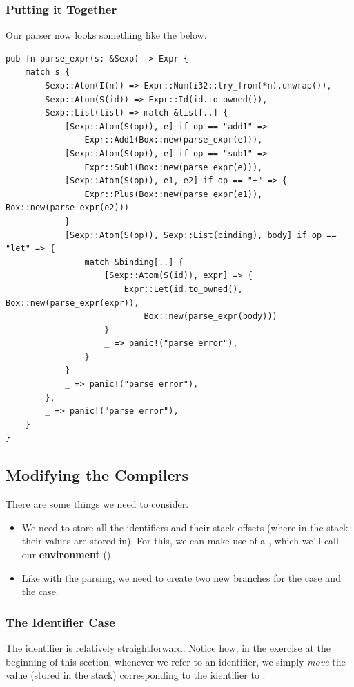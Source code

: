 \documentclass[letterpaper]{article}
\begin{document}
\subsubsection{Putting it Together}
Our parser now looks something like the below.
\begin{verbatim}
pub fn parse_expr(s: &Sexp) -> Expr {
    match s {
        Sexp::Atom(I(n)) => Expr::Num(i32::try_from(*n).unwrap()),
        Sexp::Atom(S(id)) => Expr::Id(id.to_owned()),
        Sexp::List(list) => match &list[..] {
            [Sexp::Atom(S(op)), e] if op == "add1" => 
                Expr::Add1(Box::new(parse_expr(e))),
            [Sexp::Atom(S(op)), e] if op == "sub1" => 
                Expr::Sub1(Box::new(parse_expr(e))),
            [Sexp::Atom(S(op)), e1, e2] if op == "+" => {
                Expr::Plus(Box::new(parse_expr(e1)), Box::new(parse_expr(e2)))
            }
            [Sexp::Atom(S(op)), Sexp::List(binding), body] if op == "let" => {
                match &binding[..] {
                    [Sexp::Atom(S(id)), expr] => {
                        Expr::Let(id.to_owned(), Box::new(parse_expr(expr)), 
                            Box::new(parse_expr(body)))
                    }
                    _ => panic!("parse error"),
                }
            }
            _ => panic!("parse error"),
        },
        _ => panic!("parse error"),
    }
}\end{verbatim}

\subsection{Modifying the Compilers}
There are some things we need to consider. 
\begin{itemize}
    \item We need to store all the identifiers and their stack offsets (where in the stack their values are stored in). For this, we can make use of a , which we'll call our \textbf{environment} (). 
    \item Like with the parsing, we need to create two new branches for the  case and the  case.  
\end{itemize}

\subsubsection{The Identifier Case}
The identifier is relatively straightforward. Notice how, in the exercise at the beginning of this section, whenever we refer to an identifier, we simply \emph{move} the value (stored in the stack) corresponding to the identifier to . 
\end{document}
